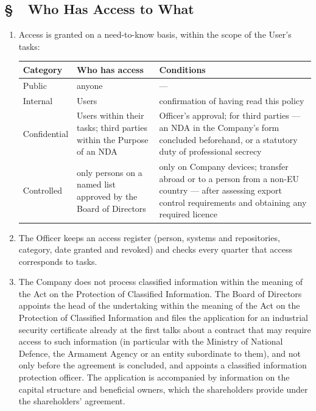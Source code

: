 \documentclass[11pt,a4paper]{report}
\newcounter{paragraf}
\newcommand{\paragraf}[1]{%
  \refstepcounter{paragraf}%
  \Needspace{5\baselineskip}%
  \subsection*{\S~\theparagraf\ #1}%
}
\newenvironment{ContractClause}[1]{\paragraf{#1}}{\par}
\begin{document}
\begin{ContractClause}{Who Has Access to What}
\begin{enumerate}
  \item Access is granted on a need-to-know basis, within the scope of the User's tasks:

\begin{center}
\begin{tabularx}{\linewidth}{@{}>{\raggedright\arraybackslash}p{2.6cm} >{\raggedright\arraybackslash}X >{\raggedright\arraybackslash}X@{}}
\toprule
\textbf{Category} & \textbf{Who has access} & \textbf{Conditions} \\
\midrule
Public & anyone & --- \\
Internal & Users & confirmation of having read this policy \\
Confidential & Users within their tasks; third parties within the Purpose of an NDA & Officer's approval; for third parties --- an NDA in the Company's form concluded beforehand, or a statutory duty of professional secrecy \\
Controlled & only persons on a named list approved by the Board of Directors & only on Company devices; transfer abroad or to a person from a non-EU country --- after assessing export control requirements and obtaining any required licence \\
\bottomrule
\end{tabularx}
\end{center}

  \item The Officer keeps an access register (person, systems and repositories, category, date granted and revoked) and checks every quarter that access corresponds to tasks.
  \item The Company does not process classified information within the meaning of the Act on the Protection of Classified Information. The Board of Directors appoints the head of the undertaking within the meaning of the Act on the Protection of Classified Information and files the application for an industrial security certificate already at the first talks about a contract that may require access to such information (in particular with the Ministry of National Defence, the Armament Agency or an entity subordinate to them), and not only before the agreement is concluded, and appoints a classified information protection officer. The application is accompanied by information on the capital structure and beneficial owners, which the shareholders provide under the shareholders' agreement.
\end{enumerate}
\end{ContractClause}
\end{document}
